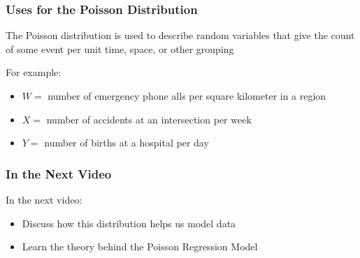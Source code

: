 \documentclass{beamer}
\begin{document}
\begin{frame}[fragile]\frametitle{Uses for the Poisson Distribution}

	The Poisson distribution is used to describe random variables that give the count of some event per unit time, space, or other grouping
	
	For example:
	\begin{itemize}

		\item $W =$ number of emergency phone alls per square kilometer	in a region
	
		\item $X =$ number of accidents at an intersection per week
		
		\item $Y =$ number of births at a hospital per day
	
	\end{itemize}

\end{frame}



\begin{frame}[fragile]\frametitle{In the Next Video}

	In the next video:
	\begin{itemize}

		\item Discuss how this distribution helps us model data
		
		\item Learn the theory behind the Poisson Regression Model
	
	\end{itemize}

\end{frame}
\end{document}
